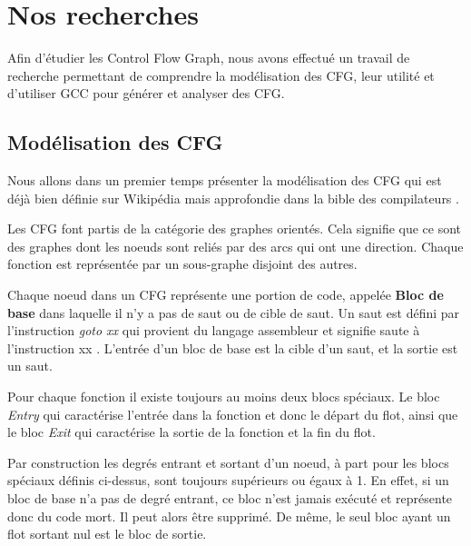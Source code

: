 \section{Nos recherches}

Afin d'étudier les Control Flow Graph, nous avons effectué un travail de recherche permettant de comprendre la modélisation des CFG, leur utilité et d'utiliser GCC pour générer et analyser des CFG. 

\subsection{Modélisation des CFG}
Nous allons dans un premier temps présenter la modélisation des CFG qui est déjà bien définie sur Wikipédia \cite{wiki:Graphe_de_flot_de_controle} mais approfondie dans la bible des compilateurs \cite{compilateurs}.

Les CFG font partis de la catégorie des graphes orientés. Cela signifie que ce sont des graphes dont les noeuds sont reliés par des arcs qui ont une direction. Chaque fonction est représentée par un sous-graphe disjoint des autres.

Chaque noeud dans un CFG représente une portion de code, appelée \textbf{Bloc de base} dans laquelle il n'y a pas de saut ou de cible de saut. Un saut est défini par l'instruction \textit{goto xx} qui provient du langage assembleur et signifie \og saute à l'instruction xx \fg{}. L'entrée d'un bloc de base est la cible d'un saut, et la sortie est un saut.


Pour chaque fonction il existe toujours au moins deux blocs spéciaux. Le bloc \textit{Entry} qui caractérise l'entrée dans la fonction et donc le départ du flot, ainsi que le bloc \textit{Exit} qui caractérise la sortie de la fonction et la fin du flot.

Par construction les degrés entrant et sortant d'un noeud, à part pour les blocs spéciaux définis ci-dessus, sont toujours supérieurs ou égaux à 1. En effet, si un bloc de base n'a pas de degré entrant, ce bloc n'est jamais exécuté et représente donc du code mort. Il peut alors être supprimé. De même, le seul bloc ayant un flot sortant nul est le bloc de sortie. 

